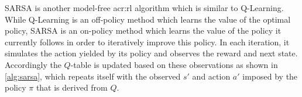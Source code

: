 SARSA \cite{sutton1998reinforcement} is another model-free \acrshort{acr:rl} algorithm which is similar to Q-Learning.
While Q-Learning is an off-policy method which learns the value of the optimal policy, SARSA is an on-policy method which learns the value of the policy it currently follows in order to iteratively improve this policy.
In each iteration, it simulates the action yielded by its policy and observes the reward and next state.
Accordingly the $Q$-table is updated based on these observations as shown in \autoref{alg:sarsa}, which repeats itself with the observed $s'$ and action $a'$ imposed by the policy $\pi$ that is derived from $Q$.

